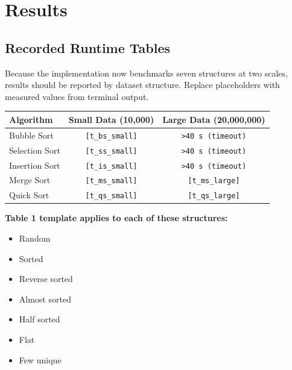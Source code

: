 \documentclass[12pt,a4paper]{article}
\begin{document}
\section{Results}
\subsection{Recorded Runtime Tables}
Because the implementation now benchmarks seven structures at two scales, results should be reported by dataset structure. Replace placeholders with measured values from terminal output.

\begin{center}
\begin{tabular}{lcc}
\toprule
Algorithm & Small Data (10,000) & Large Data (20,000,000) \\
\midrule
Bubble Sort & \texttt{[t\_bs\_small]} & \texttt{>40 s (timeout)} \\
Selection Sort & \texttt{[t\_ss\_small]} & \texttt{>40 s (timeout)} \\
Insertion Sort & \texttt{[t\_is\_small]} & \texttt{>40 s (timeout)} \\
Merge Sort & \texttt{[t\_ms\_small]} & \texttt{[t\_ms\_large]} \\
Quick Sort & \texttt{[t\_qs\_small]} & \texttt{[t\_qs\_large]} \\
\bottomrule
\end{tabular}
\end{center}

\vspace{0.5em}
\noindent\textbf{Table 1 template applies to each of these structures:}
\begin{itemize}
    \item Random
    \item Sorted
    \item Reverse sorted
    \item Almost sorted
    \item Half sorted
    \item Flat
    \item Few unique
\end{itemize}
\end{document}

